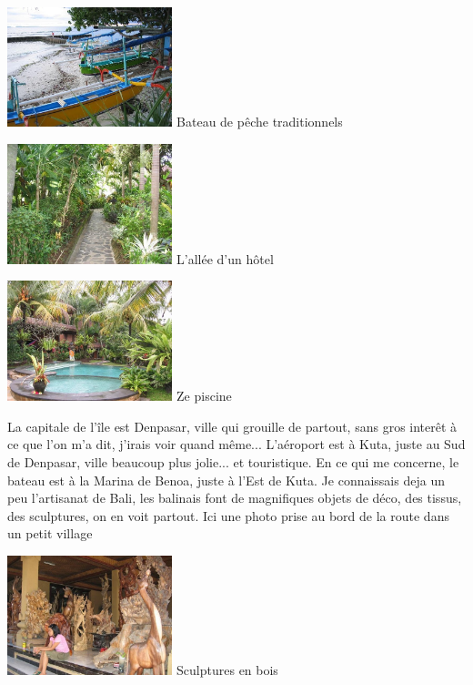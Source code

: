 \begin{multicols}{2}
\hspace*{-0.65cm}
\includegraphics[width=4.8cm]{articles/Arrivee-sur-bali/1207567564x5vI.jpg}
Bateau de pêche traditionnels

\hspace*{-0.65cm}
\includegraphics[width=4.8cm]{articles/Arrivee-sur-bali/120756756426sq.jpg}
L'allée d'un hôtel

\hspace*{-0.65cm}
\includegraphics[width=4.8cm]{articles/Arrivee-sur-bali/1207567563njCA.jpg}
Ze piscine

La capitale de l'île est Denpasar, ville qui grouille de partout, sans gros interêt à ce que l'on m'a dit, j'irais voir quand même... L'aéroport est à Kuta, juste au Sud de Denpasar, ville beaucoup plus jolie... et touristique. En ce qui me concerne, le bateau est à la Marina de Benoa, juste à l'Est de Kuta. Je connaissais deja un peu l'artisanat de Bali, les balinais font de magnifiques objets de déco, des tissus, des sculptures, on en voit partout. Ici une photo prise au bord de la route dans un petit village

\hspace*{-0.65cm}
\includegraphics[width=4.8cm]{articles/Arrivee-sur-bali/1207567562ISpn.jpg}
Sculptures en bois


\end{multicols}
